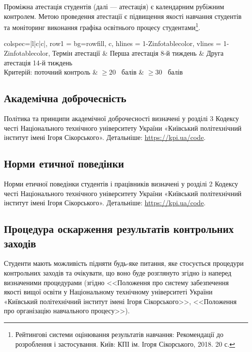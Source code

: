\documentclass{Syllabus}
\begin{document}
Проміжна атестація студентів (далі --- атестація) є календарним рубіжним контролем. Метою проведення атестації є підвищення якості навчання студентів та моніторинг виконання графіка освітнього процесу студентами\footnote{Рейтингові системи оцінювання результатів навчання: Рекомендації до розроблення і застосування. Київ: КПІ ім. Ігоря Сікорського, 2018. 20 с.}.

\begin{center}
	\begin{tblr}{
        colspec={|l|c|c|},
      	row{1} = {bg=rowfill, c},
      	hlines = {1-Z}{infotablecolor},
      	vlines = {1-Z}{infotablecolor},
    }
		Термін атестації                    & {Перша атестація 8-й тиждень}     & {Друга атестація 14-й тиждень}     \\
		{Критерій: поточний контроль} & $\ge 20$~ балів        & $\ge 30$~ балів \\
	\end{tblr}
\end{center}

\subsection*{Академічна доброчесність}

Політика та принципи академічної доброчесності визначені у розділі 3 Кодексу честі Національного технічного університету України «Київський політехнічний інститут імені Ігоря Сікорського». Детальніше: \url{https://kpi.ua/code}.

\subsection*{Норми етичної поведінки}

Норми етичної поведінки студентів і працівників визначені у розділі 2 Кодексу честі Національного технічного університету України «Київський політехнічний інститут імені Ігоря Сікорського». Детальніше: \url{https://kpi.ua/code}.

\subsection*{Процедура оскарження результатів контрольних заходів}

Студенти мають можливість підняти будь-яке питання, яке стосується процедури контрольних заходів та очікувати, що воно буде розглянуто згідно із наперед визначеними процедурами (згідно <<Положення про систему забезпечення якості вищої освіти у Національному технічному університеті України «Київський політехнічний інститут імені Ігоря Сікорського>>, <<Положення про організацію навчального процесу>>).
\end{document}
